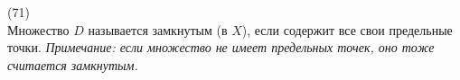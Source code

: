 (71)\\
Множество $D$ называется замкнутым (в $X$), если содержит все свои предельные точки. \textit{Примечание: если множество не имеет предельных точек, оно тоже считается замкнутым.}